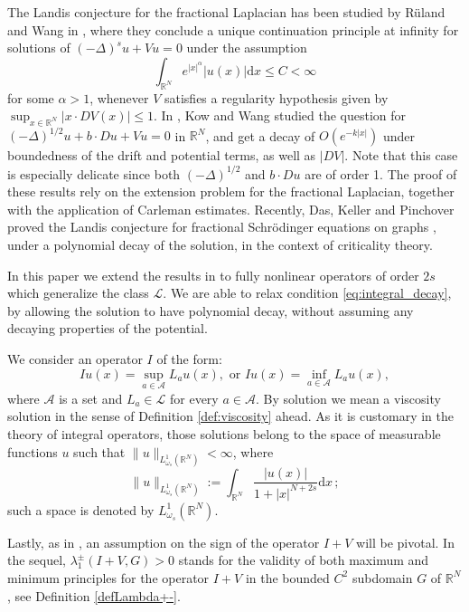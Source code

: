 \documentclass[a4paper,11pt]{article}
\newcommand{\R}{\mathbb{R}}
\newcommand{\I}{I}
\newcommand{\A}{\mathcal{A}}
\newcommand{\Lomega}{L_{\omega_s}^1(\R^N)}
\newcommand{\dx}{\mathrm{d}x}
\begin{document}
The Landis conjecture for the fractional Laplacian has been studied by Rüland and Wang in \cite{ruland_fractional_2019}, where they conclude a unique continuation principle at infinity for solutions of $(-\Delta)^su + Vu = 0$ under the assumption
\begin{equation}
\label{eq:integral_decay}
\int_{\R^N} e^{|x|^{\alpha}} |u(x)| \dx \leq C < \infty
\end{equation}
for some $\alpha>1$, whenever $V$ satisfies a regularity hypothesis given by $\sup_{x\in\R^N} |x \cdot D V(x) |\leq 1$. In \cite{kow_landis-type_2023}, Kow and Wang studied the question for $(-\Delta)^{1/2}u + b \cdot D u + Vu = 0$ in $\R^N$, and get a decay of $O(e^{-k|x|})$ under boundedness of the drift and potential terms, as well as $|D V|$. Note that this case is especially delicate since both $(-\Delta)^{1/2}$ and $b\cdot D u$ are of order 1. The proof of these results rely on the extension problem for the fractional Laplacian, together with the application of Carleman estimates. Recently, Das, Keller and Pinchover proved the Landis conjecture for fractional Schrödinger equations on graphs \cite{PinchoverGraphs}, under a polynomial decay of the solution, in the context of criticality theory. 

In this paper we extend the results in \cite{kow_landis-type_2023, ruland_fractional_2019} to fully nonlinear operators of order $2s$ which generalize  the class $\mathcal{L}$. 
We are able to relax condition \eqref{eq:integral_decay}, by allowing the solution to have polynomial decay, without assuming any decaying properties of the potential. 

We consider an operator $I$ of the form:
\begin{equation}
\label{eq:isaacs}
Iu(x) = \sup_{a\in \A} L_{a}u(x), \text{ or } Iu(x) = \inf_{a\in \A} L_{a}u(x),
\end{equation}
where $\A$ is a set and $L_{a} \in \mathcal{L}$ for every $a\in \A$. 
By solution we mean a viscosity solution in the sense of Definition \ref{def:viscosity} ahead. 
As it is customary in the theory of integral operators, those solutions belong to the space of measurable functions $u$ such that $\|u\|_{\Lomega} < \infty$, where
\[\|u\|_{\Lomega} := \int_{\R^N} \frac{|u(x)|}{1+|x|^{N+2s}} \dx \, ;\]  such a space is denoted 
by $\Lomega$.

Lastly, as in \cite{Pinchover, rossi_landis_2020, sirakov_vazquez_2021}, an assumption on the sign of the operator $\I +V$ will be pivotal. In the sequel, $\lambda_1^\pm ( \I + V, G) >0$  stands for the validity of both maximum and minimum principles for the operator $\I +V$ in the bounded $C^2$ subdomain $G$ of $\R^N $, see Definition \ref{defLambda+-}.  
\smallskip 
\end{document}
